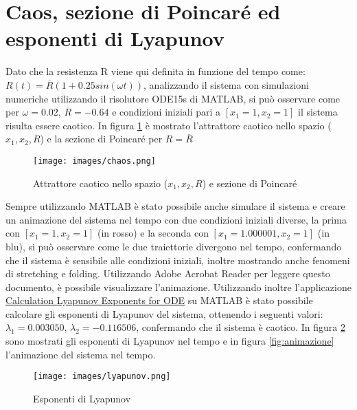 \documentclass{article}
\begin{document}
\section{Caos, sezione di Poincaré ed esponenti di Lyapunov}

Dato che la resistenza R viene qui definita in funzione del tempo come: \\ \(R(t) = \overline{R}(1 + 0.25sin(\omega t))\), analizzando il sistema con simulazioni numeriche utilizzando il risolutore ODE15s di MATLAB, si può osservare come per \(\omega = 0.02\), \(\overline{R} = -0.64\) e condizioni iniziali pari a \([x_1 = 1, x_2 = 1]\) il sistema risulta essere caotico. In figura \ref{fig:chaos} è mostrato l'attrattore caotico nello spazio (\(x_1, x_2, R\)) e la sezione di Poincaré per \(R = \overline{R}\)

\begin{figure}[ht]
    \centering
    \texttt{[image: images/chaos.png]}
    \caption{Attrattore caotico nello spazio (\(x_1, x_2, R\)) e sezione di Poincaré}
    \label{fig:chaos}
\end{figure}

Sempre utilizzando MATLAB è stato possibile anche simulare il sistema e creare un animazione del sistema nel tempo con due condizioni iniziali diverse, la prima con \([x_1 = 1, x_2 = 1]\) (in rosso) e la seconda con \([x_1 = 1.000001, x_2 = 1]\) (in blu), si può osservare come le due traiettorie divergono nel tempo, confermando che il sistema è sensibile alle condizioni iniziali, inoltre mostrando anche fenomeni di stretching e folding. Utilizzando Adobe Acrobat Reader per leggere questo documento, è possibile visualizzare l'animazione. Utilizzando inoltre l'applicazione \href{https://it.mathworks.com/matlabcentral/fileexchange/4628-calculation-lyapunov-exponents-for-ode}{Calculation Lyapunov Exponents for ODE} su MATLAB è stato possibile calcolare gli esponenti di Lyapunov del sistema, ottenendo i seguenti valori: \(\lambda_1 = 0.003050\), \(\lambda_2 = -0.116506\), confermando che il sistema è caotico. In figura \ref{fig:lyapunov} sono mostrati gli esponenti di Lyapunov nel tempo e in figura \ref{fig:animazione} l'animazione del sistema nel tempo.

\begin{figure}[ht]
    \centering
    \texttt{[image: images/lyapunov.png]}
    \caption{Esponenti di Lyapunov}
    \label{fig:lyapunov}
\end{figure}

\end{document}
